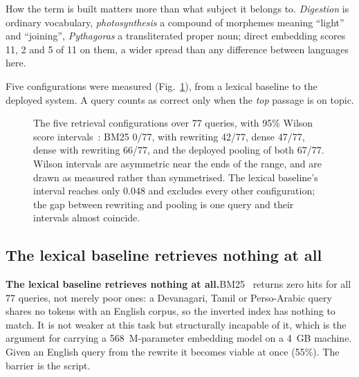 How the term is built matters more than what subject it belongs to. \emph{Digestion} is ordinary vocabulary, \emph{photosynthesis} a compound of morphemes meaning ``light'' and ``joining'', \emph{Pythagoras} a transliterated proper noun; direct embedding scores 11, 2 and 5 of 11 on them, a wider spread than any difference between languages here.

Five configurations were measured (Fig.~\ref{fig:ablation}), from a lexical baseline to the deployed system. A query counts as correct only when the \emph{top} passage is on topic.


\begin{figure}
\centering
{}
\caption{The five retrieval configurations over 77 queries, with 95\% Wilson score intervals~\cite{b26}: BM25 0/77, with rewriting 42/77, dense 47/77, dense with rewriting 66/77, and the deployed pooling of both 67/77. Wilson intervals are asymmetric near the ends of the range, and are drawn as measured rather than symmetrised. The lexical baseline's interval reaches only 0.048 and excludes every other configuration; the gap between rewriting and pooling is one query and their intervals almost coincide.}
\label{fig:ablation}
\end{figure}

\ifspringer\subsection{The lexical baseline retrieves nothing at all}\else\textbf{The lexical baseline retrieves nothing at all.}\fi BM25~\cite{b25} returns zero hits for all 77 queries, not merely poor ones: a Devanagari, Tamil or Perso-Arabic query shares no tokens with an English corpus, so the inverted index has nothing to match. It is not weaker at this task but structurally incapable of it, which is the argument for carrying a 568~M-parameter embedding model on a 4~GB machine. Given an English query from the rewrite it becomes viable at once (55\%). The barrier is the script.

